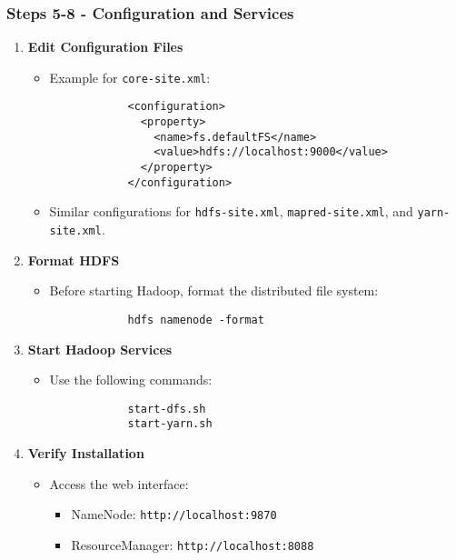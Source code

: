 \documentclass{beamer}
\begin{document}
\begin{frame}[fragile]
    \frametitle{Steps 5-8 - Configuration and Services}
    \begin{enumerate}
        \item \textbf{Edit Configuration Files}
        \begin{itemize}
            \item Example for \texttt{core-site.xml}:
            \begin{lstlisting}
            <configuration>
              <property>
                <name>fs.defaultFS</name>
                <value>hdfs://localhost:9000</value>
              </property>
            </configuration>
            \end{lstlisting}
            \item Similar configurations for \texttt{hdfs-site.xml}, \texttt{mapred-site.xml}, and \texttt{yarn-site.xml}.
        \end{itemize}
        
        \item \textbf{Format HDFS}
        \begin{itemize}
            \item Before starting Hadoop, format the distributed file system:
             \begin{lstlisting}
            hdfs namenode -format
            \end{lstlisting}
        \end{itemize}
        
        \item \textbf{Start Hadoop Services}
        \begin{itemize}
            \item Use the following commands:
            \begin{lstlisting}
            start-dfs.sh
            start-yarn.sh
            \end{lstlisting}
        \end{itemize}
        
        \item \textbf{Verify Installation}
        \begin{itemize}
            \item Access the web interface:
            \begin{itemize}
                \item NameNode: \texttt{http://localhost:9870}
                \item ResourceManager: \texttt{http://localhost:8088}
            \end{itemize}
        \end{itemize}
    \end{enumerate}
\end{frame}
\end{document}
